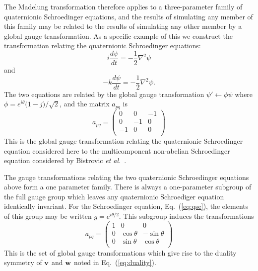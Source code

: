 \documentclass[a4paper,aps,prd,preprint,groupedaddress]{revtex4}
\newcommand{\bfv}{{\bf v}}
\newcommand{\bfw}{{\bf w}}
\begin{document}
The Madelung transformation therefore applies to a three-parameter family of quaternionic Schroedinger equations, and the results of simulating any member of this family may be related to the results of simulating any other member by a global gauge transformation. As a specific example of this we construct the transformation relating the quaternionic Schroedinger equations:
\begin{equation}\label{eq:qse}
i \frac{d\psi}{dt} = -\frac{1}{2} \nabla^2 \psi
\end{equation}
and
\begin{equation}
-k \frac{d\psi}{dt} = -\frac{1}{2} \nabla^2 \psi. 
\end{equation}
The two equations are related by the global gauge transformation $\psi' \leftarrow \phi\psi$ where $\phi = e^{i\theta}\bigl(1-j\bigr)/\sqrt{2}$, and the matrix $a_{pq}$ is
\begin{equation}
a_{pq} =
\begin{pmatrix}
0&0&-1\\
0&-1&0\\
-1&0&0\\
\end{pmatrix}
\end{equation}
This is the global gauge transformation relating the quaternionic Schroedinger equation considered here to the multicomponent non-abelian Schroedinger equation considered by Bistrovic {\it et al.}~\cite{bib:jackiw2}. 

The gauge transformations relating the two quaternionic Schroedinger equations above form a one parameter family. There is always a one-parameter subgroup of the full gauge group which leaves any quaternionic Schroediger equation identically invariant. For the Schroedinger equation, Eq.~(\ref{eq:qse}), the elements of this group may be written $g= e^{i\theta/2}$. This subgroup induces the transformations
\begin{equation}
a_{pq} =
\begin{pmatrix}
1&0&0\\
0&\cos{\theta}&-\sin{\theta}\\
0&\sin{\theta}&\cos{\theta}\\
\end{pmatrix}
\end{equation}
This is the set of global gauge transformations which give rise to the duality symmetry of $\bfv$ and $\bfw$ noted in Eq.~(\ref{eq:duality}).
\end{document}
